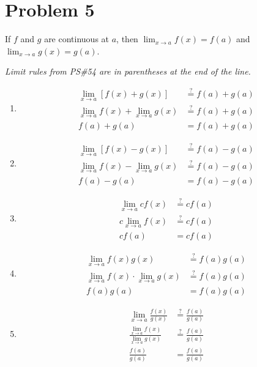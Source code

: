 \documentclass{article}
\newcommand*{\problem}[1]{\section*{Problem #1}}
\newcommand*{\limit}[2][x]{\ensuremath{\displaystyle\lim_{#1\to#2}}}
\newcommand*{\Limit}[3][x]{\ensuremath{\displaystyle\lim_{#1\to#2}\left[#3\right]}}
\begin{document}
\problem{5}
If $f$ and $g$ are continuous at $a$, then $\limit{a}f(x)=f(a)$ and $\limit{a}g(x)=g(a)$.

\noindent\textit{Limit rules from PS\#54 are in parentheses at the end of the line.}

\begin{multicols}{2}
	\allowdisplaybreaks[0]
	\begin{enumerate}
		\item \begin{align*}
			\Limit{a}{f(x)+g(x)}&\overset{?}{=}f(a)+g(a) \\
			\limit{a}f(x)+\limit{a}g(x)&\overset{?}{=}f(a)+g(a) \tag{1} \\
			f(a)+g(a)&=f(a)+g(a)
		\end{align*}
		\item \begin{align*}
			\Limit{a}{f(x)-g(x)}&\overset{?}{=}f(a)-g(a) \\
			\limit{a}f(x)-\limit{a}g(x)&\overset{?}{=}f(a)-g(a) \tag{1} \\
			f(a)-g(a)&=f(a)-g(a)
		\end{align*}
		\item \begin{align*}
			\limit{a}cf(x)&\overset{?}{=}cf(a) \\
			c\limit{a}f(x)&\overset{?}{=}cf(a) \tag{2} \\
			cf(a)&=cf(a)
		\end{align*}
		\item \begin{align*}
			\limit{a}f(x)g(x)&\overset{?}{=}f(a)g(a) \\
			\limit{a}f(x)\cdot\limit{a}g(x)&\overset{?}{=}f(a)g(a) \tag{3} \\
			f(a)g(a)&=f(a)g(a)
		\end{align*}
		\item \begin{align*}
			\limit{a}\frac{f(x)}{g(x)}&\overset{?}{=}\frac{f(a)}{g(a)} \\
			\frac{\limit{a}f(x)}{\limit{a}g(x)}&\overset{?}{=}\frac{f(a)}{g(a)} \tag{4} \\
			\frac{f(a)}{g(a)}&=\frac{f(a)}{g(a)}
		\end{align*}
	\end{enumerate}
	\allowdisplaybreaks
\end{multicols}
\end{document}
